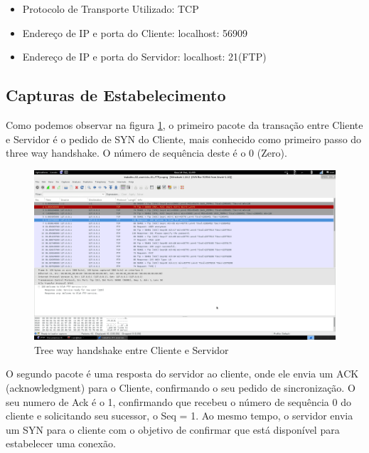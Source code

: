 \begin{itemize}

    \item Protocolo de Transporte Utilizado: TCP

    \item Endereço de IP e porta do Cliente: localhost: 56909

    \item Endereço de IP e porta do Servidor: localhost: 21(FTP)

\end{itemize}

\subsection{Capturas de Estabelecimento}

Como podemos observar na figura \ref{fig:ftp1}, o primeiro pacote da transação entre Cliente e Servidor é
o pedido de SYN do Cliente, mais conhecido como primeiro passo do three way handshake. O
número de sequência deste é o 0 (Zero).

\begin{figure}[h]
  \centering

  \includegraphics[width=450px, scale=1]{figuras/ftp1}
  \caption{Tree way handshake entre Cliente e Servidor}

\label{fig:ftp1}
\end{figure}

O segundo pacote é uma resposta do servidor ao cliente, onde ele envia um ACK (acknowledgment)
para o Cliente, confirmando o seu pedido de sincronização. O seu numero de Ack é o 1, confirmando que recebeu o número de sequência 0 do cliente e solicitando seu sucessor, o Seq = 1. Ao mesmo
tempo, o servidor envia um SYN para o cliente com o objetivo de confirmar que está disponível
 para estabelecer uma conexão.

